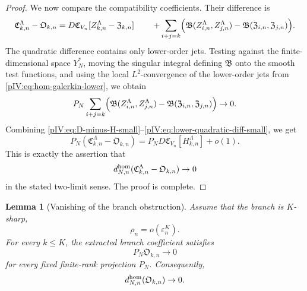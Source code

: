 \documentclass[11pt]{article}
\numberwithin{equation}{section}
\theoremstyle{plain}
\newtheorem{lemma}{Lemma}[section]
\theoremstyle{definition}
\theoremstyle{remark}
\newcommand{\eps}{\varepsilon}
\newcommand{\calB}{\mathfrak B}
\newcommand{\calC}{\mathfrak C}
\newcommand{\frakZ}{\mathfrak Z}
\newcommand{\Ored}{\mathfrak O}
\begin{document}
\begin{proof}
We now compare the compatibility coefficients.  Their difference is
\begin{align}
        \calC^\Lambda_{k,n}-\Ored_{k,n}
        &=D\calC_{V_n}[Z^\Lambda_{k,n}-\frakZ_{k,n}]
\notag\
        &\quad+
        \sum_{i+j=k}
        \Bigl(
        \calB(Z^\Lambda_{i,n},Z^\Lambda_{j,n})
        -
        \calB(\frakZ_{i,n},\frakZ_{j,n})
        \Bigr).
\label{pIV:eq:coeff-diff-hom}
\end{align}
The quadratic difference contains only lower-order jets.  Testing against the
finite-dimensional space \(Y_N^*\), moving the singular integral defining \(\calB\)
onto the smooth test functions, and using the local \(L^2\)-convergence of the
lower-order jets from \eqref{pIV:eq:hom-galerkin-lower}, we obtain
\begin{equation}\label{pIV:eq:lower-quadratic-diff-small}
        P_N
        \sum_{i+j=k}
        \Bigl(
        \calB(Z^\Lambda_{i,n},Z^\Lambda_{j,n})
        -
        \calB(\frakZ_{i,n},\frakZ_{j,n})
        \Bigr)\to0 .
\end{equation}
Combining \eqref{pIV:eq:D-minus-H-small}--\eqref{pIV:eq:lower-quadratic-diff-small}, we get
\[
        P_N(\calC^\Lambda_{k,n}-\Ored_{k,n})
        =P_ND\calC_{V_n}[H^\Lambda_{k,n}]+o(1).
\]
This is exactly the assertion that
\[
        d^{\rm hom}_{N,n}(\calC^\Lambda_{k,n}-\Ored_{k,n})\to0
\]
in the stated two-limit sense.  The proof is complete.
\end{proof}

\begin{lemma}[Vanishing of the branch obstruction]\label{pIV:lem:branch-obstruction-vanishes}
Assume that the branch is \(K\)-sharp,
\[
        \rho_n=o(\eps_n^K).
\]
For every \(k\le K\), the extracted branch coefficient satisfies
\begin{equation}\label{pIV:eq:branch-obstruction-projected-zero}
        P_N\Ored_{k,n}\to0
\end{equation}
for every fixed finite-rank projection \(P_N\).  Consequently,
\begin{equation}\label{pIV:eq:branch-obstruction-hom-distance-zero}
        d^{\rm hom}_{N,n}(\Ored_{k,n})\to0 .
\end{equation}
\end{lemma}
\end{document}
